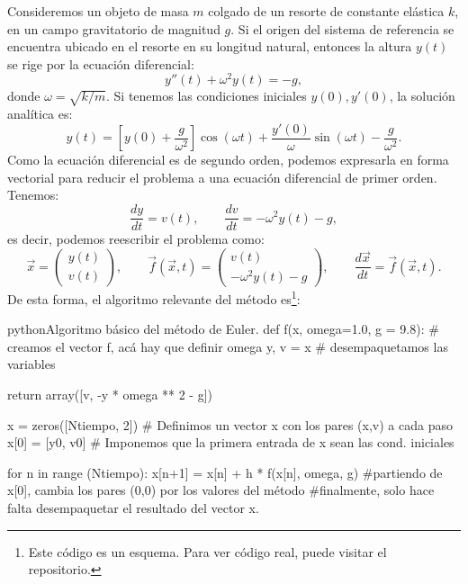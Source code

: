 Consideremos un objeto de masa $m$ colgado de un resorte de constante elástica $k$, en un campo gravitatorio de magnitud $g$. Si el origen del sistema de referencia se encuentra ubicado en el resorte en su longitud natural, entonces la altura $y(t)$ se rige por la ecuación diferencial:
\begin{equation}
 y''(t) + \omega^2 y(t) = -g,
\end{equation}
donde $\omega = \sqrt{k/m}$. Si tenemos las condiciones iniciales $y(0), y'(0)$, la solución analítica es:
\begin{equation}
  y(t) = \left[ y(0) + \frac{g}{\omega^2} \right]\cos(\omega t) + \frac{y'(0)}{\omega} \sin(\omega t) - \frac{g}{\omega^2}.
\end{equation}
Como la ecuación diferencial es de segundo orden, podemos expresarla en forma vectorial para reducir el problema a una ecuación diferencial de primer orden. Tenemos:
\begin{equation}
  \frac{dy}{dt} = v(t), \qquad \frac{dv}{dt} = -\omega^2 y(t) - g,
\end{equation}
es decir, podemos reescribir el problema como:
\begin{equation}
  \vec{x} = \begin{pmatrix} y(t) \\ v(t)  \end{pmatrix}, \qquad 
    \vec{f}(\vec{x},t) = \begin{pmatrix} v(t) \\ -\omega^2 y(t) -g  \end{pmatrix}, \qquad 
      \frac{d\vec{x}}{dt} = \vec{f}(\vec{x},t).
\end{equation}
De esta forma, el algoritmo relevante del método es\footnote{Este código es un esquema. Para ver código real, puede visitar el repositorio.}:
\begin{sourcecode}{python}{Algoritmo básico del método de Euler.}
  def f(x, omega=1.0, g = 9.8): # creamos el vector f, acá hay que definir omega
      y, v = x # desempaquetamos las variables

      return array([v, -y * omega ** 2 - g]) 

  x = zeros([Ntiempo, 2]) # Definimos un vector x con los pares (x,v) a cada paso
  x[0] = [y0, v0] # Imponemos que la primera entrada de x sean las cond. iniciales


 for n in range (Ntiempo):
     x[n+1] = x[n] + h * f(x[n], omega, g) #partiendo de x[0], cambia los pares (0,0) por los valores del método
 #finalmente, solo hace falta desempaquetar el resultado del vector x.
\end{sourcecode}
